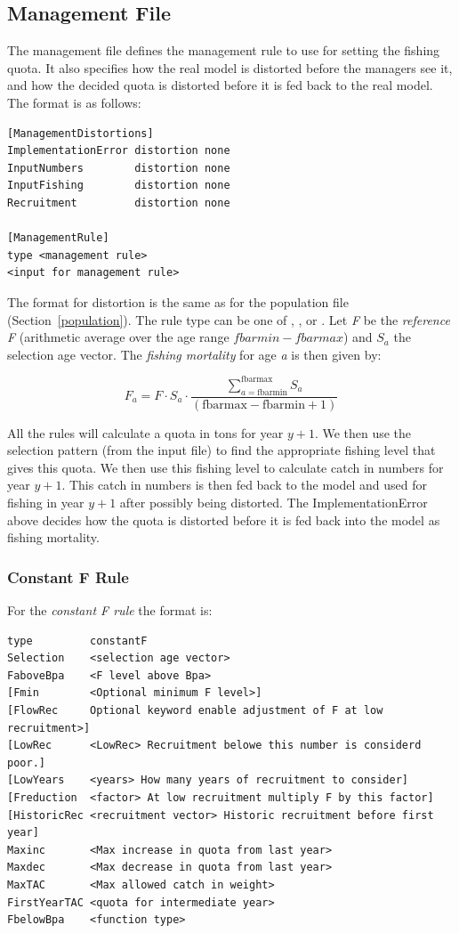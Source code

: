 \documentclass[12pt,twoside,a4paper]{article}
\begin{document}
\subsection{Management File}
\label{management}
The management file defines the management rule to use for setting the
fishing quota. It also specifies how the real model is distorted
before the managers see it, and how the decided quota is distorted
before it is fed back to the real model. The format is as follows:
\begin{verbatim}
[ManagementDistortions] 
ImplementationError distortion none
InputNumbers        distortion none 
InputFishing        distortion none 
Recruitment         distortion none

[ManagementRule]
type <management rule>
<input for management rule>
\end{verbatim}

The format for distortion is the same as for the population file
(Section~\ref{population}). 
The rule type can be one of  ,  
, or .
Let \emph{F} be the \emph{reference F} (arithmetic average over the age range
$fbarmin-fbarmax$) and $S_a$ the selection age vector. The
\emph{fishing mortality} for age \emph{a} is then given by:

\[
F_a=\displaystyle F\cdot S_a\cdot \frac{\displaystyle\sum_{a=\mathrm{fbarmin}}^{\mathrm{fbarmax}}{S_a}}{(\mathrm{fbarmax} - \mathrm{fbarmin} + 1)}
\]

All the rules will calculate a quota in tons for year $y+1$. We then
use the selection pattern (from the input file) to find the
appropriate fishing level that gives this quota. We then use this
fishing level to calculate catch in numbers for year $y+1$. This
catch in numbers is then fed back to the model and used for fishing in
year $y+1$ after possibly being distorted.  The ImplementationError
above decides how the quota is distorted before it is fed back into
the model as fishing mortality.



\subsubsection{Constant F Rule}
\label{cfr}
For the \emph{constant F rule} the format is:
\begin{verbatim}
type         constantF
Selection    <selection age vector>
FaboveBpa    <F level above Bpa>
[Fmin        <Optional minimum F level>]
[FlowRec     Optional keyword enable adjustment of F at low recruitment>]
[LowRec      <LowRec> Recruitment belowe this number is considerd poor.]
[LowYears    <years> How many years of recruitment to consider]
[Freduction  <factor> At low recruitment multiply F by this factor]
[HistoricRec <recruitment vector> Historic recruitment before first year]
Maxinc       <Max increase in quota from last year>
Maxdec       <Max decrease in quota from last year>
MaxTAC       <Max allowed catch in weight>
FirstYearTAC <quota for intermediate year>
FbelowBpa    <function type>
\end{verbatim}
\end{document}
